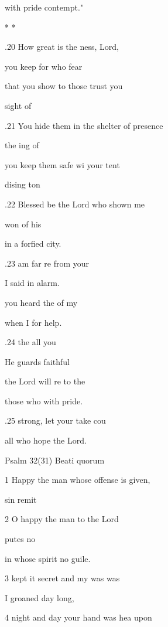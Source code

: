 with pride  contempt." 

\mi{*} \pl{* * *} * * \pl{*} 

.20 How great is the ness, Lord, 

 you keep for  who fear  

that you show to those  trust you 

  sight of  

.21 You hide them in the shelter of  presence 

 the ing of  

you keep them safe wi your tent 

 dising ton 

.22 Blessed be the Lord who  shown me 

 won of his  

in a forfied city. 

.23  am far re from your  

I said in  alarm. 

 you heard the  of my  

when I  for help. 

.24  the  all you  

He guards  faithful 

 the Lord will re to the  

those who  with pride. 

.25  strong, let your  take cou 

all who hope  the Lord. 

Psalm 32(31) Beati quorum 


1 Happy the man whose offense is given, 

 sin  remit 

2 O happy the man to  the Lord 

 putes no  

in whose spirit  no guile. 

3  kept it secret and my  was was 

I groaned  day long, 

4  night and day your hand was hea upon  

